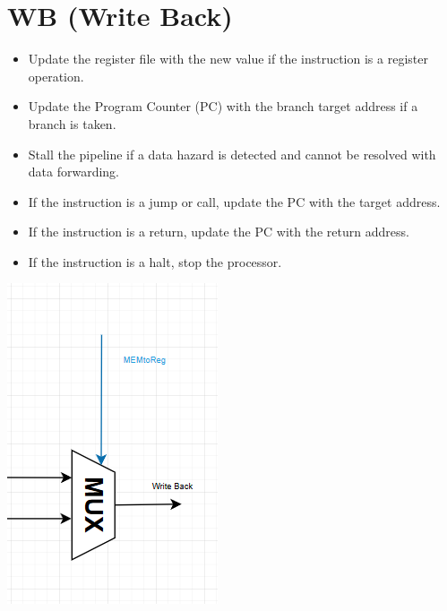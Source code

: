 \documentclass{report}
\begin{document}
\section*{WB (Write Back)}
\begin{minipage}{0.6\textwidth}
\begin{itemize}
    \item Update the register file with the new value if the instruction is a register operation.
    \item Update the Program Counter (PC) with the branch target address if a branch is taken.
    \item Stall the pipeline if a data hazard is detected and cannot be resolved with data forwarding.
    \item If the instruction is a jump or call, update the PC with the target address.
    \item If the instruction is a return, update the PC with the return address.
    \item If the instruction is a halt, stop the processor.
\end{itemize}
\end{minipage}
\begin{minipage}{0.35\textwidth}
\begin{center}
    \includegraphics[width=\textwidth]{./assets/WB.png}
\end{center}
\end{minipage}
\end{document}
